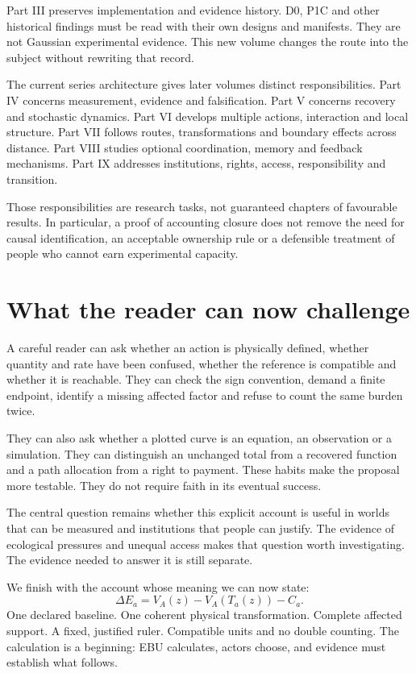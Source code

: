 Part III preserves implementation and evidence history. D0, P1C and other historical findings must be read with their own designs and manifests. They are not Gaussian experimental evidence. This new volume changes the route into the subject without rewriting that record.

The current series architecture gives later volumes distinct responsibilities. Part IV concerns measurement, evidence and falsification. Part V concerns recovery and stochastic dynamics. Part VI develops multiple actions, interaction and local structure. Part VII follows routes, transformations and boundary effects across distance. Part VIII studies optional coordination, memory and feedback mechanisms. Part IX addresses institutions, rights, access, responsibility and transition.\cite{series}

Those responsibilities are research tasks, not guaranteed chapters of favourable results. In particular, a proof of accounting closure does not remove the need for causal identification, an acceptable ownership rule or a defensible treatment of people who cannot earn experimental capacity.

\section{What the reader can now challenge}
A careful reader can ask whether an action is physically defined, whether quantity and rate have been confused, whether the reference is compatible and whether it is reachable. They can check the sign convention, demand a finite endpoint, identify a missing affected factor and refuse to count the same burden twice.

They can also ask whether a plotted curve is an equation, an observation or a simulation. They can distinguish an unchanged total from a recovered function and a path allocation from a right to payment. These habits make the proposal more testable. They do not require faith in its eventual success.

The central question remains whether this explicit account is useful in worlds that can be measured and institutions that people can justify. The evidence of ecological pressures and unequal access makes that question worth investigating. The evidence needed to answer it is still separate.

We finish with the account whose meaning we can now state:
\begin{equation*}
 \boxed{\Delta E_a=V_A(z)-V_A(T_a(z))-C_a.}
\end{equation*}
One declared baseline. One coherent physical transformation. Complete affected support. A fixed, justified ruler. Compatible units and no double counting. The calculation is a beginning: EBU calculates, actors choose, and evidence must establish what follows.
